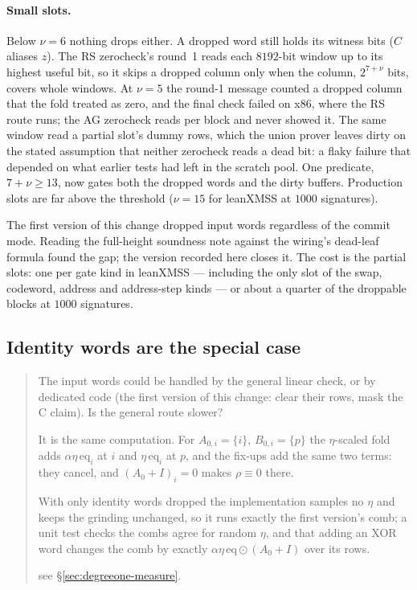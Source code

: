 \documentclass[11pt]{article}
\newcommand{\eq}{\mathrm{eq}}
\newenvironment{optsummary}{%
  \begin{quote}\small
  \begin{description}
  \setlength{\itemsep}{1pt}\setlength{\parsep}{0pt}\setlength{\topsep}{2pt}
}{%
  \end{description}
  \end{quote}
}
\begin{document}
\paragraph{Small slots.} Below $\nu = 6$ nothing drops either. A dropped
word still holds its witness bits ($C$ aliases $z$). The RS zerocheck's
round~1 reads each $8192$-bit window up to its highest useful bit, so it
skips a dropped column only when the column, $2^{7+\nu}$ bits, covers whole
windows. At $\nu = 5$ the round-1 message counted a dropped column that
the fold treated as zero, and the final check failed on x86, where the RS
route runs; the AG zerocheck reads per block and never showed it. The
same window read a partial slot's dummy rows, which the union prover
leaves dirty on the stated assumption that neither zerocheck reads a dead
bit: a flaky failure that depended on what earlier tests had left in the
scratch pool. One predicate, $7 + \nu \ge 13$, now gates both the dropped
words and the dirty buffers. Production slots are far above the threshold
($\nu = 15$ for leanXMSS at $1000$ signatures).

The first version of this change dropped input words regardless of the
commit mode. Reading the full-height soundness note against the wiring's
dead-leaf formula found the gap; the version recorded here closes it.
The cost is the partial slots: one per gate kind in leanXMSS --- including
the only slot of the swap, codeword, address and address-step kinds ---
or about a quarter of the droppable blocks at $1000$ signatures.

\subsection{Identity words are the special case}\label{sec:identity-special}

\begin{optsummary}
\item[Question:] The input words could be handled by the general linear check, or by dedicated code (the first version of this change: clear their rows, mask the C claim). Is the general route slower?
\item[Answer:] It is the same computation. For $A_{0,i} = \{i\}$, $B_{0,i}=\{p\}$ the $\eta$-scaled fold adds $\alpha\eta\,\eq_i$ at $i$ and $\eta\,\eq_i$ at $p$, and the fix-ups add the same two terms: they cancel, and $(A_0 + I)_i = 0$ makes $\rho\equiv 0$ there.
\item[Mechanism:] With only identity words dropped the implementation samples no $\eta$ and keeps the grinding unchanged, so it runs exactly the first version's comb; a unit test checks the combs agree for random $\eta$, and that adding an XOR word changes the comb by exactly $\alpha\eta\,\eq\odot(A_0+I)$ over its rows.
\item[Result:] see \S\ref{sec:degreeone-measure}.
\end{optsummary}
\end{document}
